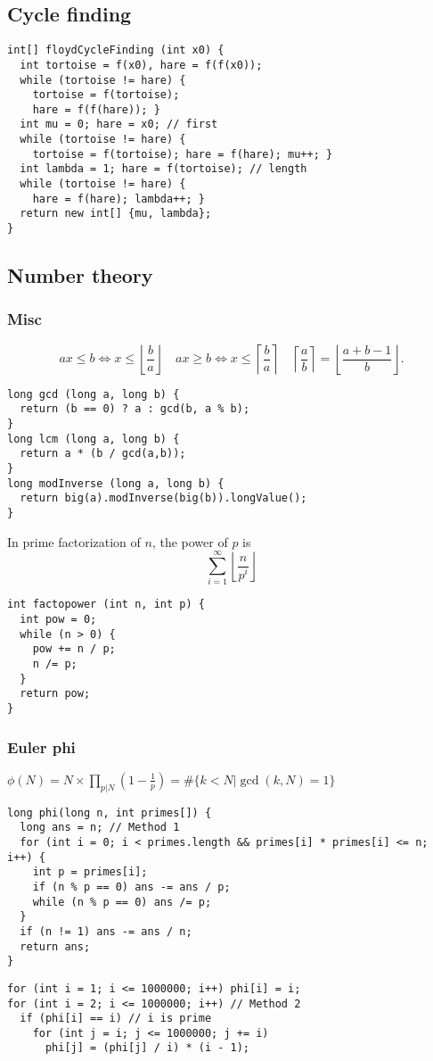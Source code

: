 \subsection{Cycle finding}
\begin{lstlisting}
int[] floydCycleFinding (int x0) {
  int tortoise = f(x0), hare = f(f(x0));
  while (tortoise != hare) {
    tortoise = f(tortoise);
    hare = f(f(hare)); }
  int mu = 0; hare = x0; // first
  while (tortoise != hare) {
    tortoise = f(tortoise); hare = f(hare); mu++; }
  int lambda = 1; hare = f(tortoise); // length
  while (tortoise != hare) {
    hare = f(hare); lambda++; }
  return new int[] {mu, lambda};
}
\end{lstlisting}
\subsection{Number theory}
\subsubsection{Misc}
\[
  ax \leq b \Leftrightarrow x \leq \left\lfloor \frac{b}{a} \right\rfloor \quad
  ax \geq b \Leftrightarrow x \leq \left\lceil \frac{b}{a} \right\rceil \quad
  \left\lceil \frac{a}{b} \right\rceil = \left\lfloor \frac{a+b-1}{b} \right\rfloor.
\]
\begin{lstlisting}
long gcd (long a, long b) {
  return (b == 0) ? a : gcd(b, a % b);
}
long lcm (long a, long b) {
  return a * (b / gcd(a,b));
}
long modInverse (long a, long b) {
  return big(a).modInverse(big(b)).longValue();
}
\end{lstlisting}
In prime factorization of $n$, the power of $p$ is
\[\sum_{i=1}^{\infty} \left\lfloor \frac{n}{p^i} \right\rfloor\]
\begin{lstlisting}
int factopower (int n, int p) {
  int pow = 0;
  while (n > 0) {
    pow += n / p;
    n /= p;
  }
  return pow;
}
\end{lstlisting}

\subsubsection{Euler phi}
$\phi(N) = N \times \prod_{p | N} (1 - \frac{1}{p}) = \#\{k < N | \gcd(k,N) = 1\}$
\begin{lstlisting}
long phi(long n, int primes[]) {
  long ans = n; // Method 1
  for (int i = 0; i < primes.length && primes[i] * primes[i] <= n; i++) {
    int p = primes[i];
    if (n % p == 0) ans -= ans / p;
    while (n % p == 0) ans /= p;
  }
  if (n != 1) ans -= ans / n;
  return ans;
}
\end{lstlisting}
\begin{lstlisting}
for (int i = 1; i <= 1000000; i++) phi[i] = i;
for (int i = 2; i <= 1000000; i++) // Method 2
  if (phi[i] == i) // i is prime
    for (int j = i; j <= 1000000; j += i)
      phi[j] = (phi[j] / i) * (i - 1);
\end{lstlisting}
